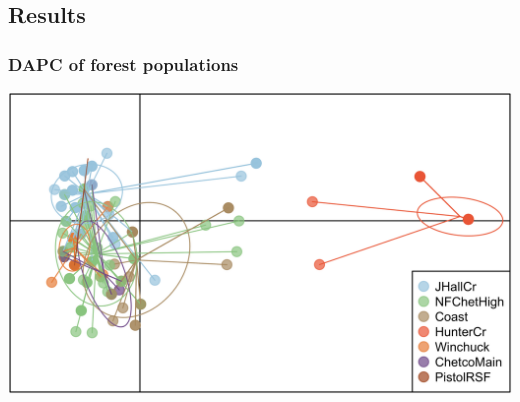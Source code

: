 \documentclass{beamer}\usepackage[]{graphicx}\usepackage[]{color}
\begin{document}
\subsection*{Results}
\begin{frame}[allowpagebreak,T]
	\frametitle{DAPC of forest populations}
	\centering
	\includegraphics[keepaspectratio, width=0.85\paperwidth]{../DAPC.png}
\end{frame}
\end{document}
